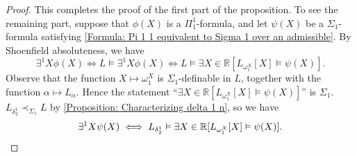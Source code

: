 \documentclass{mhkr}
\newcommand{\added}[1]{#1}
\begin{document}
\begin{proof}
{    This completes the proof of the first part of the proposition.
    To see the remaining part, suppose that $\phi(X)$ is a $\Pi^1_1$-formula, and let $\psi(X)$ be a $\Sigma_1$-formula satisfying \eqref{Formula: Pi 1 1 equivalent to Sigma 1 over an admissible}.
    By Shoenfield absoluteness, we have
    \begin{equation*}
        \exists^1 X \phi(X) \iff L\vDash \exists^1 X \phi(X) \iff L\vDash \exists X\in \mathbb{R} [L_{\omega_1^X}[X]\vDash \psi(X)].
    \end{equation*}
    Observe that the function $X\mapsto \omega_1^X$ is $\Sigma_1$-definable in $L$, together with the function $\alpha\mapsto L_\alpha$. Hence the statement ``$\exists X\in \mathbb{R} [L_{\omega_1^X}[X]\vDash \psi(X)]$'' is $\Sigma_1$. $L_{\delta^1_2}\prec_{\Sigma_1} L$ by \autoref{Proposition: Characterizing delta 1 n}, so we have}
    \begin{equation*}
        \added{\exists^1 X\psi(X) \iff L_{\delta^1_2}\vDash \exists X\in \mathbb{R} [L_{\omega_1^X}[X]\vDash \psi(X)].} \qedhere 
    \end{equation*}
\end{proof}
\end{document}
